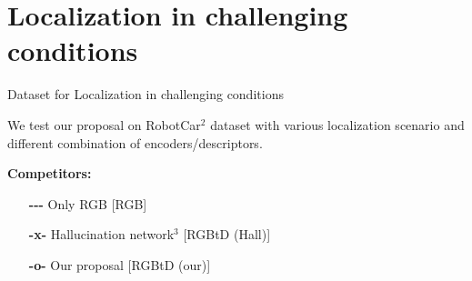 \section{Localization in challenging conditions}

\label{sec:results}

\begin{frame}{Dataset for Localization in challenging conditions}
	
	\begin{minipage}[t]{0.6\linewidth}
		We test our proposal on RobotCar$^2$ dataset with various localization scenario and different combination of encoders/descriptors.
		\vspace{1cm}
		
	\end{minipage}\hfill
	{
	\begin{minipage}[t]{0.32\linewidth}
		\textbf{Competitors:}
		\begin{itemize}
			\item[\textbf{-{}-{}-}] Only RGB [RGB]
			\item[\textbf{-x-}] Hallucination network$^3$ [RGBtD (Hall)]
			\item[\textbf{-o-}] Our proposal [RGBtD (our)]
		\end{itemize}
	\end{minipage}
	\textcolor{white}{}	
	}	
\end{frame}

